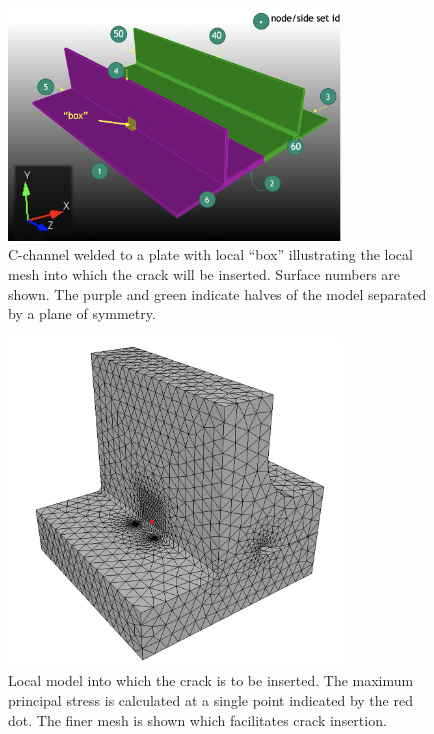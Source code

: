 \begin{figure}[h]
\centering
\includegraphics[width=250pt,height=\textheight,keepaspectratio]{surface_numbers.png}
\caption{C-channel welded to a plate with local ``box'' illustrating the local
mesh into which the crack will be inserted. Surface numbers are shown. The
purple and green indicate halves of the model separated by a plane of symmetry.}
\label{fig:surface_nums}
\end{figure}

\begin{figure}[h]
\centering
\includegraphics[width=250pt,height=\textheight,keepaspectratio]{local_mps_point.png}
\caption{Local model into which the crack is to be inserted. The maximum principal
stress is calculated at a single point indicated by the red dot. The finer mesh
is shown which facilitates crack insertion.
}
\label{fig:local_mps_point}
\end{figure}

